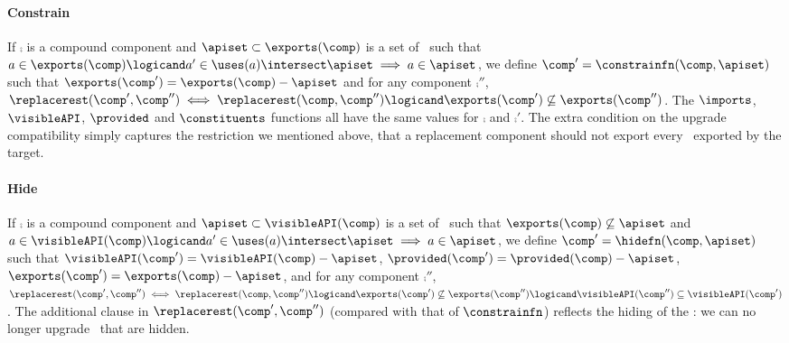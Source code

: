 \paragraph{Constrain}
If $\comp$ is a compound component
and $\apiset \subset \exports(\comp)$ is a set of \apisN\
such that
$\api \in \exports(\comp) \logicand \api' \in \uses(\api) \intersect \apiset
        \implies \api \in \apiset$,
we define $\comp' = \constrainfn(\comp,\apiset)$
such that $\exports(\comp') = \exports(\comp) - \apiset$
and for any component $\comp''$,
$\replacerest(\comp',\comp'')
  \iff \replacerest(\comp,\comp'') \logicand
                \exports(\comp') \not\subseteq \exports(\comp'')$.
The $\imports$, $\visibleAPI$, $\provided$ and $\constituents$ functions
all have the same values for $\comp$ and $\comp'$.
The extra condition on the upgrade compatibility
simply captures the restriction we mentioned above,
that a replacement component should not export every \apiN\
exported by the target.

\paragraph{Hide}
If $\comp$ is a compound component
and $\apiset \subset \visibleAPI(\comp)$ is a set of \apisN\
such that $\exports(\comp) \not\subseteq \apiset$
and $\api \in \visibleAPI(\comp) \logicand \api'\in\uses(\api)
 \intersect \apiset        \implies \api \in \apiset$,
we define $\comp' = \hidefn(\comp,\apiset)$
such that $\visibleAPI(\comp') = \visibleAPI(\comp) - \apiset$,
$\provided(\comp') = \provided(\comp) - \apiset$,
$\exports(\comp') = \exports(\comp) - \apiset$,
and for any component $\comp''$,
$\replacerest(\comp',\comp'')
  \iff \replacerest(\comp,\comp'') \logicand
                \exports(\comp') \not\subseteq \exports(\comp'')
        \logicand \visibleAPI(\comp'') \subseteq \visibleAPI(\comp')$.
The additional clause in $\replacerest(\comp',\comp'')$
(compared with that of $\constrainfn$)
reflects the hiding of the \apisN:
we can no longer upgrade \apisN\ that are hidden.


